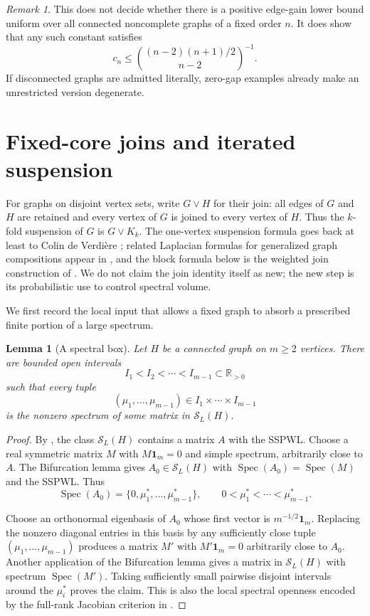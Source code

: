 \documentclass[11pt,reqno]{amsart}
\newtheorem{lemma}[theorem]{Lemma}
\theoremstyle{definition}
\theoremstyle{remark}
\newtheorem{remark}[theorem]{Remark}
\newcommand{\one}{\mathbf 1}
\newcommand{\R}{\mathbb R}
\newcommand{\SL}{\mathcal S_L}
\newcommand{\Spec}{\operatorname{Spec}}
\begin{document}
\begin{remark}
This does not decide whether there is a positive edge-gain lower bound
uniform over all connected noncomplete graphs of a fixed order $n$.  It does
show that any such constant satisfies
\[
  c_n\le\binom{(n-2)(n+1)/2}{n-2}^{-1}.
\]
If disconnected graphs are admitted literally, zero-gap examples already
make an unrestricted version degenerate.
\end{remark}

\section{Fixed-core joins and iterated suspension}\label{sec:fixed-core}

For graphs on disjoint vertex sets, write $G\vee H$ for their join: all
edges of $G$ and $H$ are retained and every vertex of $G$ is joined to every
vertex of $H$.  Thus the $k$-fold suspension of $G$ is $G\vee K_k$.  The
one-vertex suspension formula goes back at least to Colin de Verdi\`ere
\cite{CdV1988}; related Laplacian formulas for generalized graph
compositions appear in \cite{Gerbaud2010}, and the block formula below is the
weighted join construction of \cite[Lemma~2.4]{FGL2025}.  We do not claim the
join identity itself as new; the new step is its probabilistic use to control
spectral volume.

We first record the local input that allows a fixed graph to absorb a
prescribed finite portion of a large spectrum.

\begin{lemma}[A spectral box]\label{lem:spectral-box}
Let $H$ be a connected graph on $m\ge2$ vertices.  There are bounded open
intervals
\[
  I_1<I_2<\cdots<I_{m-1}\subset\R_{>0}
\]
such that every tuple
\[
  (\mu_1,\ldots,\mu_{m-1})\in I_1\times\cdots\times I_{m-1}
\]
is the nonzero spectrum of some matrix in $\SL(H)$.
\end{lemma}

\begin{proof}
By \cite[Theorem~3.11]{CFGL2026}, the class $\SL(H)$ contains a matrix
$A$ with the SSPWL.  Choose a real symmetric matrix $M$ with
$M\one_m=0$ and simple spectrum, arbitrarily close to $A$.  The
Bifurcation lemma \cite[Lemma~2.12]{CFGL2026} gives
$A_0\in\SL(H)$ with $\Spec(A_0)=\Spec(M)$ and the SSPWL.  Thus
\[
  \Spec(A_0)=\{0,\mu_1^*,\ldots,\mu_{m-1}^*\},
  \qquad 0<\mu_1^*<\cdots<\mu_{m-1}^*.
\]

Choose an orthonormal eigenbasis of $A_0$ whose first vector is
$m^{-1/2}\one_m$.  Replacing the nonzero diagonal entries in this basis by
any sufficiently close tuple $(\mu_1,\ldots,\mu_{m-1})$ produces a matrix
$M'$ with $M'\one_m=0$ arbitrarily close to $A_0$.
Another application of the Bifurcation lemma gives a matrix in $\SL(H)$
with spectrum $\Spec(M')$.  Taking sufficiently small pairwise disjoint
intervals around the $\mu_i^*$ proves the claim.  This is also the local
spectral openness encoded by the full-rank Jacobian criterion in
\cite[Theorem~3.8]{CFGL2026}.
\end{proof}
\end{document}
